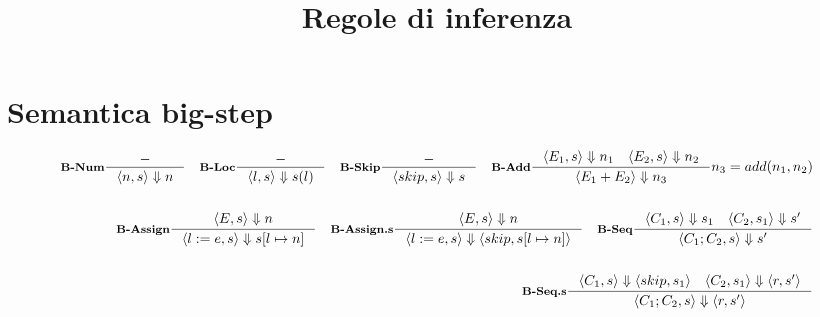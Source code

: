 \documentclass[a4paper, 10pt]{article}
\date{}
\newcommand{\infer}[4]{\inference[\textbf{#1}]{#2}{#3}#4}
\newcommand{\brule}[2]{\langle #1 \rangle \Downarrow #2}
\newcommand{\memrep}[3]{#1 \lbrack #2 \mapsto #3 \rbrack}
\begin{document}
	\title{\textbf{Regole di inferenza}}
	\maketitle
	\section*{Semantica big-step}\begin{align*}
		\infer{B-Num}{-}{\brule{n,s}{n}}{} \quad \infer{B-Loc}{-}{\brule{l,s}{s(l)}}{} \quad
		\infer{B-Skip}{-}{\brule{skip,s}{s}}{}\quad \infer{B-Add}{\brule{E_1,s}{n_1} \quad \brule{E_2,s}{n_2}}{\brule{E_1+E_2}{n_3}}{n_3 = add(n_1, n_2)} \\
		\\
		\infer{B-Assign}{\brule{E,s}{n}}{\brule{l:=e,s}{\memrep{s}{l}{n}}}{} \quad \infer{B-Assign.s}{\brule{E,s}{n}}{\brule{l:=e,s}{\langle skip, \memrep{s}{l}{n}} \rangle}{} \quad
		\infer{B-Seq}{\brule{C_1,s}{s_1} \quad \brule{C_2,s_1}{s'} }{\brule{C_1;C_2,s}{s'}}{} \\
		\\
		\infer{B-Seq.s}{\brule{C_1,s}{\langle skip,s_1 \rangle} \quad \brule{C_2,s_1}{\langle r,s' \rangle} }{\brule{C_1;C_2,s}{\langle r,s' \rangle}}{}
	\end{align*}
	
\end{document}
